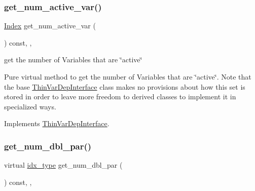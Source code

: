 \subsubsection{\texorpdfstring{get\+\_\+num\+\_\+active\+\_\+var()}{get\_num\_active\_var()}}
{\footnotesize\ttfamily \mbox{\hyperlink{group___thin_var_dep_interface___c_l_a_s_s_e_s_gad53d6229d7ec28555a9c9c2fd9abf773}{Index}} get\+\_\+num\+\_\+active\+\_\+var (\begin{DoxyParamCaption}\item[{void}]{ }\end{DoxyParamCaption}) const\hspace{0.3cm}{\ttfamily [inline]}, {\ttfamily [override]}, {\ttfamily [virtual]}}



get the number of Variables that are \char`\"{}active\char`\"{} 

Pure virtual method to get the number of Variables that are \char`\"{}active\char`\"{}. Note that the base \mbox{\hyperlink{class_s_m_spp__di__unipi__it_1_1_thin_var_dep_interface}{Thin\+Var\+Dep\+Interface}} class makes no provisions about how this set is stored in order to leave more freedom to derived classes to implement it in specialized ways. 

Implements \mbox{\hyperlink{group___thin_var_dep_interface___c_l_a_s_s_e_s_ga6dbf09c17736b358d11f617e15856981}{Thin\+Var\+Dep\+Interface}}.

\mbox{\label{class_s_m_spp__di__unipi__it_1_1_f_real_objective_a842fd454acaded84baf6b77e0d61a950}} 
\subsubsection{\texorpdfstring{get\+\_\+num\+\_\+dbl\+\_\+par()}{get\_num\_dbl\_par()}}
{\footnotesize\ttfamily virtual \mbox{\hyperlink{class_s_m_spp__di__unipi__it_1_1_thin_compute_interface_aa3d710629ad8c434286726ad810c3b47}{idx\+\_\+type}} get\+\_\+num\+\_\+dbl\+\_\+par (\begin{DoxyParamCaption}\item[{void}]{ }\end{DoxyParamCaption}) const\hspace{0.3cm}{\ttfamily [inline]}, {\ttfamily [override]}, {\ttfamily [virtual]}}



